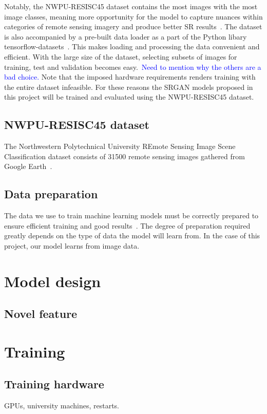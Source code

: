 Notably, the NWPU-RESISC45 dataset contains the most images with the most image classes, meaning more opportunity for the model to capture nuances within categories of remote sensing imagery and produce better SR results~\cite{ref}. The dataset is also accompanied by a pre-built data loader as a part of the Python libary tensorflow-datasets~\cite{ref}. This makes loading and processing the data convenient and efficient. With the large size of the dataset, selecting subsets of images for training, test and validation becomes easy.\ \textcolor{blue}{Need to mention why the others are a bad choice.} Note that the imposed hardware requirements renders training with the entire dataset infeasible. For these reasons the SRGAN models proposed in this project will be trained and evaluated using the NWPU-RESISC45 dataset.

\subsection{NWPU-RESISC45 dataset}
The Northwestern Polytechnical University REmote Sensing Image Scene Classification dataset consists of 31500 remote sensing images gathered from Google Earth~\cite{resisc45}. 

\subsection{Data preparation}
The data we use to train machine learning models must be correctly prepared to ensure efficient training and good results~\cite{ref}. The degree of preparation required greatly depends on the type of data the model will learn from. In the case of this project, our model learns from image data.

\section{Model design}

\subsection{Novel feature}

\section{Training}

\subsection{Training hardware}
GPUs, university machines, restarts.

